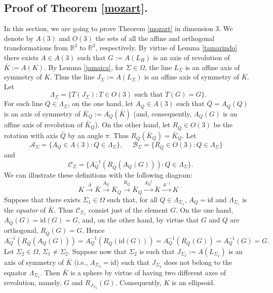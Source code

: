 \documentclass[12pt]{amsart}
\newcommand{\Rt}{\mathbb{R}^3}
\begin{document}
\subsection{Proof of Theorem \ref{mozart}.}
                In this section, we are going to prove Theorem \ref{mozart} in dimension 3. We denote 
                by $A(3)$ and $O(3)$ the sets of all the affine and orthogonal transformations from 
                $\Rt$ to $\Rt$, respectively. By virtue of Lemma \ref{tamarindo} there exists  $A\in A(3)$ 
                such that $G:=A(L_H)$ is an axis of revolution of $\bar{K}:=A(K)$. By Lemma 
                \ref{jamaica}, for $\Sigma \in \Omega$, the line $L_{\Sigma}$ is an affine axis of 
                symmetry of $K$. Thus the line $J_{\Sigma}:=A(L_{\Sigma})$  is an affine axis of 
                symmetry of $\bar{K}$.
                Let 
\[
\Lambda_{\Sigma}=\{T(J_{\Sigma}):T\in O(3) \textrm{ such that  } T(G)=G\}.
\]
                For each line $Q\in \Lambda_{\Sigma}$, on the one hand, let $A_Q\in A(3)$ such that 
                $\bar{Q}=A_Q(Q)$ is an axis of symmetry of $\bar{K}_{Q}:=A_Q(\bar{K})$ (and, 
                consequently, $A_{Q}(G)$ is an affine axis of revolution of $\bar{K}_{Q}$). On the other 
                hand, let $R_{\bar{Q}}\in O(3)$ be the rotation with axis $\bar{Q}$ by an angle $\pi$. 
                Thus $R_{\bar{Q}}(\bar{K}_{Q})=\bar{K}_{Q}$. Let 
\[
\mathcal{A}_{\Sigma}=\{A_Q \in A(3):Q\in \Lambda_{\Sigma}\},
\textrm{    }\textrm{    } \mathcal{B}_{\Sigma}=\{R_{\bar{Q}} \in O(3): Q\in \Lambda_{\Sigma}\}  \textrm{ }
\]
and
\[ 
 \textrm{ }\mathcal{C}_{\Sigma}=\{A_{Q}^{-1}(R_{\bar{Q}}(A_{Q}(G))):Q\in \Lambda_{\Sigma}\}.
\]
                  We can illustrate these definitions with the following diagram:
\[
K \stackrel{A }{\longrightarrow} \bar{K} \stackrel{A_{Q} }{\longrightarrow} \bar{K}_{Q} \stackrel{R_{\bar{Q}} }{\longrightarrow} \bar{K}_{Q}  \stackrel{ A^{-1}_{Q} }{\longrightarrow} \bar{K}  \stackrel{A^{-1} }{\longrightarrow} K 
\]
                  Suppose that there exists $\Sigma_1\in \Omega$ such that, for all 
                  $Q\in \Lambda_{\Sigma_1}$, $ A_Q=\textrm{id}$ and $\Lambda_{\Sigma_1}$ is the 
                  \textit{equator} of $\bar{K}$. Thus $\mathcal{C}_{\Sigma_1}$ consist just of the element 
                  $G$. On the one hand, $ A_Q(G)=\textrm{id}(G)=G$, and, on the other hand, 
                  by virtue that $G$ and $Q$ are orthogonal, $R_{\bar{Q}}(G)=G$. Hence
\[
A_{Q}^{-1}(R_{\bar{Q}}(A_{Q}(G)))=A_{Q}^{-1}(R_{\bar{Q}}(\textrm{id}(G)))=A_{Q}^{-1}(R_{\bar{Q}}( G))=A_{Q}^{-1}(G)=G.
\]
                  Let $\Sigma_2\in \Omega$, $\Sigma_1\not=\Sigma_2$. Suppose now that $\Sigma_2$ 
                  is such that $J_{\Sigma_2}:=A(L_{\Sigma_2})$ is an axis of symmetry of $\bar{K}$ (i.e., 
                  $ A_{\Sigma_2}=\textrm{id}$) such that $J_{\Sigma_2}$ does not belong to the equator 
                  $\Lambda_{\Sigma_1}$. Then $\bar {K}$ is a sphere by virtue of having two different 
                  axes of revolution, namely, $G$ and   $R_{J_{\Sigma_2}}(G)$. Consequently, $K$ is 
                  an ellipsoid.
 
\end{document}

